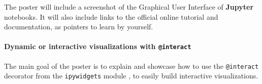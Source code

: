 \documentclass[runningheads]{llncs}
\newcommand{\Jupyter}{\textbf{Jupyter}}
\begin{document}
The poster will include a screenshot of the Graphical User Interface of \Jupyter{} notebooks.
It will also include links to the official online tutorial and documentation, as pointers to learn by yourself.

\paragraph{Dynamic or interactive visualizations with \texttt{@interact}}

The main goal of the poster is to explain and showcase how to use the \texttt{@interact} decorator from the \texttt{ipywidgets} module \cite{ipywidgets}, to easily build interactive visualizations.






\end{document}
